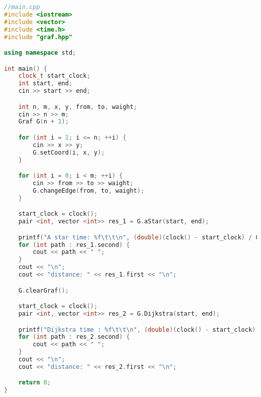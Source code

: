 \begin{lstlisting}[language=C++]
//main.cpp
#include <iostream>
#include <vector>
#include <time.h>
#include "graf.hpp"

using namespace std;

int main() {
    clock_t start_clock;
    int start, end;
    cin >> start >> end;

    int n, m, x, y, from, to, waight;
    cin >> n >> m;
    Graf G(n + 1);

    for (int i = 1; i <= n; ++i) {
        cin >> x >> y;
        G.setCoord(i, x, y);
    }

    for (int i = 0; i < m; ++i) {
        cin >> from >> to >> waight;
        G.changeEdge(from, to, waight);
    }

    start_clock = clock();
    pair <int, vector <int>> res_1 = G.aStar(start, end);

    printf("A star time: %f\t\t\n", (double)(clock() - start_clock) / CLOCKS_PER_SEC);
    for (int path : res_1.second) {
        cout << path << " ";
    }
    cout << "\n";
    cout << "distance: " << res_1.first << "\n";

    G.clearGraf();

    start_clock = clock();
    pair <int, vector <int>> res_2 = G.Dijkstra(start, end);

    printf("Dijkstra time : %f\t\t\n", (double)(clock() - start_clock) / CLOCKS_PER_SEC);
    for (int path : res_2.second) {
        cout << path << " ";
    }
    cout << "\n";
    cout << "distance: " << res_2.first << "\n";

    return 0;
}
\end{lstlisting}

\pagebreak
